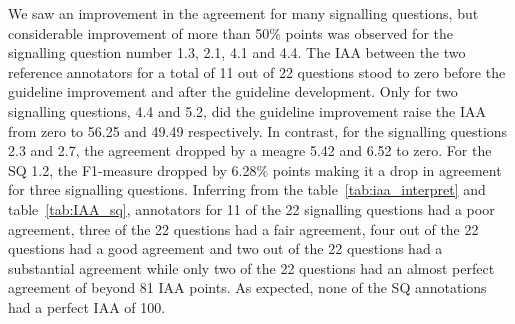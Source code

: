 \documentclass[sn-mathphys,Numbered]{sn-jnl}%
\theoremstyle{thmstyleone}%
\theoremstyle{thmstyletwo}%
\theoremstyle{thmstylethree}%
\begin{document}
We saw an improvement in the agreement for many signalling questions, but considerable improvement of more than 50\% points was observed for the signalling question number 1.3, 2.1, 4.1 and 4.4.
The IAA between the two reference annotators for a total of 11 out of 22 questions stood to zero before the guideline improvement and after the guideline development.
Only for two signalling questions, 4.4 and 5.2, did the guideline improvement raise the IAA from zero to 56.25 and 49.49 respectively.
In contrast, for the signalling questions 2.3 and 2.7, the agreement dropped by a meagre 5.42 and 6.52 to zero.
For the SQ 1.2, the F1-measure dropped by 6.28\% points making it a drop in agreement for three signalling questions.
Inferring from the table~\ref{tab:iaa_interpret} and table~\ref{tab:IAA_sq}, annotators for 11 of the 22 signalling questions had a poor agreement, three of the 22 questions had a fair agreement, four out of the 22 questions had a good agreement and two out of the 22 questions had a substantial agreement while only two of the 22 questions had an almost perfect agreement of beyond 81 IAA points.
As expected, none of the SQ annotations had a perfect IAA of 100.
%
%
%
\end{document}
